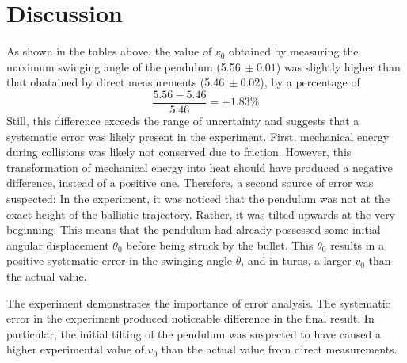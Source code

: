 \section{Discussion}
As shown in the tables above, the value of $v_0$ obtained by measuring the maximum swinging angle of the pendulum (5.56$\ \pm 0.01$) was slightly higher than that obatained by direct measurements (5.46$\ \pm 0.02$), by a percentage of
$$
\frac{5.56-5.46}{5.46} = +1.83\%
$$Still, this difference exceeds the range of uncertainty and suggests that a systematic error was likely present in the experiment. First, mechanical energy during collisions was likely not conserved due to friction. However, this transformation of mechanical energy into heat should have produced a negative difference, instead of a positive one. Therefore, a second source of error was suspected: In the experiment, it was noticed that the pendulum was not at the exact height of the ballistic trajectory. Rather, it was tilted upwards at the very beginning. This means that the pendulum had already possessed some initial angular displacement $\theta_0$ before being struck by the bullet. This $\theta_0$ results in a positive systematic error in the swinging angle $\theta$, and in turns, a larger $v_0$ than the actual value.

The experiment demonstrates the importance of error analysis. The systematic error in the experiment produced noticeable difference in the final result. In particular, the initial tilting of the pendulum was suspected to have caused a higher experimental value of $v_0$ than the actual value from direct measurements.

